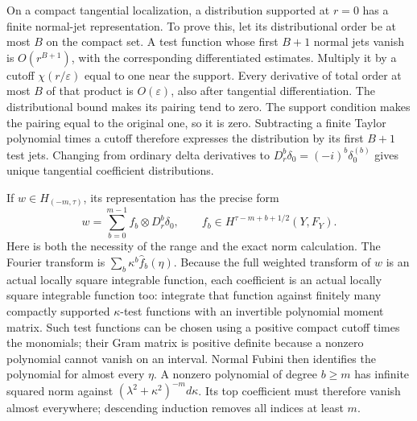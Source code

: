\documentclass[
  11pt,
]{article}
\begin{document}
On a compact tangential localization, a distribution supported at
\(r=0\) has a finite normal-jet representation. To prove this, let its
distributional order be at most \(B\) on the compact set. A test
function whose first \(B+1\) normal jets vanish is \(O(r^{B+1})\), with
the corresponding differentiated estimates. Multiply it by a cutoff
\(\chi(r/\varepsilon)\) equal to one near the support. Every derivative
of total order at most \(B\) of that product is \(O(\varepsilon)\), also
after tangential differentiation. The distributional bound makes its
pairing tend to zero. The support condition makes the pairing equal to
the original one, so it is zero. Subtracting a finite Taylor polynomial
times a cutoff therefore expresses the distribution by its first \(B+1\)
test jets. Changing from ordinary delta derivatives to
\(D_r^b\delta_0=(-i)^b\delta_0^{(b)}\) gives unique tangential
coefficient distributions.

If \(w\in H_{(-m,\tau)}\), its representation has the precise form \[
 w=\sum_{b=0}^{m-1}f_b\otimes D_r^b\delta_0,
 \qquad f_b\in H^{\tau-m+b+1/2}(Y,F_Y).
 \tag{MH14}
\] Here is both the necessity of the range and the exact norm
calculation. The Fourier transform is
\(\sum_b\kappa^b\widehat f_b(\eta)\). Because the full weighted
transform of \(w\) is an actual locally square integrable function, each
coefficient is an actual locally square integrable function too:
integrate that function against finitely many compactly supported
\(\kappa\)-test functions with an invertible polynomial moment matrix.
Such test functions can be chosen using a positive compact cutoff times
the monomials; their Gram matrix is positive definite because a nonzero
polynomial cannot vanish on an interval. Normal Fubini then identifies
the polynomial for almost every \(\eta\). A nonzero polynomial of degree
\(b\geq m\) has infinite squared norm against
\((\lambda^2+\kappa^2)^{-m}d\kappa\). Its top coefficient must therefore
vanish almost everywhere; descending induction removes all indices at
least \(m\).
\end{document}
